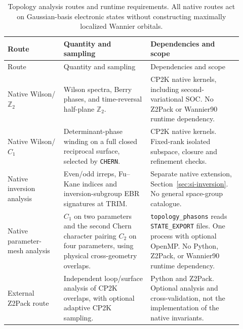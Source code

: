 \documentclass[11pt]{article}
\begin{document}
\begingroup
\small
\setlength{\tabcolsep}{4pt}
\begin{longtable}{L{0.22\linewidth}L{0.34\linewidth}L{0.36\linewidth}}
\caption{Topology analysis routes and runtime requirements. All native
routes act on Gaussian-basis electronic states without constructing
maximally localized Wannier orbitals.}
\label{tab:topology-routes}\\
\toprule
Route & Quantity and sampling & Dependencies and scope \\
\midrule
\endfirsthead
\toprule Route & Quantity and sampling & Dependencies and scope \\
\midrule
\endhead
Native Wilson/$\mathbb Z_2$ & Wilson spectra, Berry phases, and
time-reversal half-plane $\mathbb Z_2$. & CP2K native kernels, including
second-variational SOC. No Z2Pack or Wannier90 runtime dependency.\\
Native Wilson/$C_1$ & Determinant-phase winding on a full closed
reciprocal surface, selected by \texttt{CHERN}. & CP2K native kernels.
Fixed-rank isolated subspace, closure and refinement checks.\\
Native inversion analysis & Even/odd irreps, Fu--Kane indices and
inversion-subgroup EBR signatures at TRIM. & Separate native extension,
Section~\ref{sec:si-inversion}. No general space-group catalogue.\\
Native parameter-mesh analysis & $C_1$ on two parameters and the second
Chern character pairing $C_2$ on four parameters, using physical
cross-geometry overlaps. & \texttt{topology\_phasons} reads
\texttt{STATE\_EXPORT} files. One process with optional OpenMP.
No Python, Z2Pack, or Wannier90 runtime dependency.\\
External Z2Pack route & Independent loop/surface analysis of CP2K
overlaps, with optional adaptive CP2K sampling. & Python and Z2Pack.
Optional analysis and cross-validation, not the implementation of
the native invariants.\\
\bottomrule
\end{longtable}
\endgroup
\end{document}
